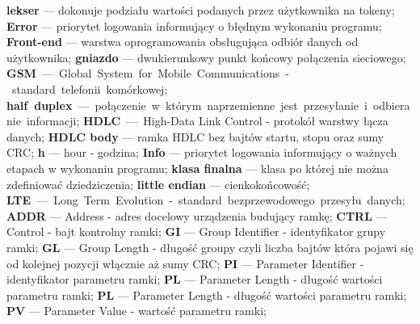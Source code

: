 \textbf{lekser} --- dokonuje podziału wartości podanych przez użytkownika na tokeny;\newline
\textbf{Error} --- priorytet logowania informujący o błędnym wykonaniu programu;\newline
\textbf{Front-end} --- warstwa oprogramowania obsługująca odbiór danych od użytkownika;\newline
\textbf{gniazdo} --- dwukierunkowy punkt końcowy połączenia sieciowego;\newline
\textbf{GSM} --- Global System for Mobile Communications - standard telefonii komórkowej;\newline
\textbf{half duplex} --- połączenie w którym naprzemienne jest przesyłanie i odbieranie informacji;\newline
\textbf{HDLC} --- High-Data Link Control - protokół warstwy łącza danych;\newline
\textbf{HDLC body} --- ramka HDLC bez bajtów startu, stopu oraz sumy CRC;\newline
\textbf{h} --- hour - godzina;\newline
\textbf{Info} --- priorytet logowania informujący o ważnych etapach w wykonaniu programu;\newline
\textbf{klasa finalna} --- klasa po której nie można zdefiniować dziedziczenia;\newline
\textbf{little endian} --- cienkokońcowość;\newline
\textbf{LTE} --- Long Term Evolution - standard bezprzewodowego przesyłu danych;\newline
\textbf{ADDR} --- Address - adres docelowy urządzenia budujący ramkę;\newline
\textbf{CTRL} --- Control - bajt kontrolny ramki;\newline
\textbf{GI} --- Group Identifier - identyfikator grupy ramki;\newline
\textbf{GL} --- Group Length - długość groupy czyli liczba bajtów która pojawi się od kolejnej pozycji włącznie aż sumy CRC;\newline
\textbf{PI} --- Parameter Identifier - identyfikator parametru ramki;\newline
\textbf{PL} --- Parameter Length - długość wartości parametru ramki;\newline
\textbf{PL} --- Parameter Length - długość wartości parametru ramki;\newline
\textbf{PV} --- Parameter Value - wartość parametru ramki;\newline


